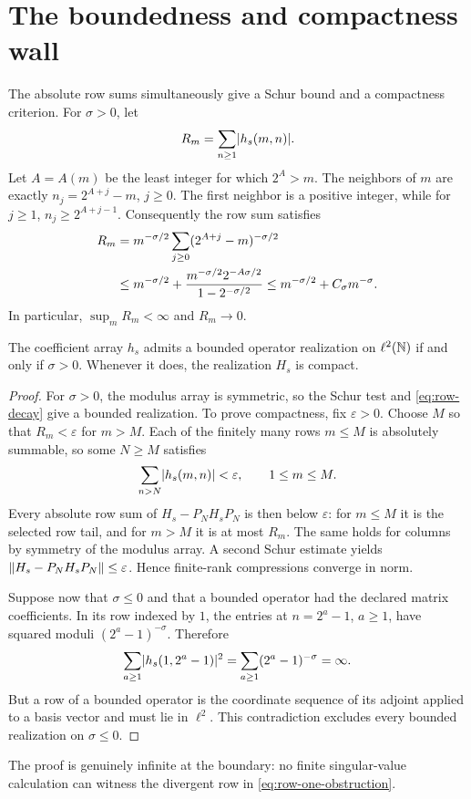 \section{The boundedness and compactness wall}
\label{sec:bounded}

The absolute row sums simultaneously give a Schur bound and a compactness
criterion.  For $\sigma>0$, let
\begin{equation}
  R_m=\sum_{n\ge1}\lvert h_s(m,n)\rvert.
  \label{eq:row-sum}
\end{equation}
Let $A=A(m)$ be the least integer for which $2^A>m$.  The neighbors of $m$
are exactly $n_j=2^{A+j}-m$, $j\ge0$.  The first neighbor is a positive
integer, while for $j\ge1$, $n_j\ge2^{A+j-1}$.  Consequently the row sum
satisfies
\begin{align}
 R_m
 &=m^{-\sigma/2}\sum_{j\ge0}(2^{A+j}-m)^{-\sigma/2} \notag\\
 &\le m^{-\sigma/2}
   +\frac{m^{-\sigma/2}2^{-A\sigma/2}}
          {1-2^{-\sigma/2}}
 \le m^{-\sigma/2}+C_\sigma m^{-\sigma}.
 \label{eq:row-decay}
\end{align}
In particular, $\sup_mR_m<\infty$ and $R_m\to0$.

\begin{theorem}
\label{thm:bounded}
The coefficient array $h_s$ admits a bounded operator realization on
$\ell^2(\mathbb N)$ if and only if $\sigma>0$.  Whenever it does, the realization
$H_s$ is compact.
\end{theorem}

\begin{proof}
For $\sigma>0$, the modulus array is symmetric, so the Schur test and
\cref{eq:row-decay} give a bounded realization.  To prove compactness, fix
$\varepsilon>0$.  Choose $M$ so that $R_m<\varepsilon$ for $m>M$.  Each of
the finitely many rows $m\le M$ is absolutely summable, so some $N\ge M$
satisfies
\begin{equation*}
  \sum_{n>N}\lvert h_s(m,n)\rvert<\varepsilon,
  \qquad 1\le m\le M.
\end{equation*}
Every absolute row sum of $H_s-P_NH_sP_N$ is then below $\varepsilon$:
for $m\le M$ it is the selected row tail, and for $m>M$ it is at most
$R_m$.  The same holds for columns by symmetry of the modulus array.  A
second Schur estimate yields
$\lVert H_s-P_NH_sP_N\rVert\le\varepsilon$.  Hence finite-rank compressions
converge in norm.

Suppose now that $\sigma\le0$ and that a bounded operator had the declared
matrix coefficients.  In its row indexed by $1$, the entries at
$n=2^a-1$, $a\ge1$, have squared moduli $(2^a-1)^{-\sigma}$.  Therefore
\begin{equation}
  \sum_{a\ge1}\lvert h_s(1,2^a-1)\rvert^2
  =\sum_{a\ge1}(2^a-1)^{-\sigma}=\infty.
  \label{eq:row-one-obstruction}
\end{equation}
But a row of a bounded operator is the coordinate sequence of its adjoint
applied to a basis vector and must lie in $\ell^2$.  This contradiction
excludes every bounded realization on $\sigma\le0$.
\end{proof}

The proof is genuinely infinite at the boundary: no finite singular-value
calculation can witness the divergent row in
\cref{eq:row-one-obstruction}.
